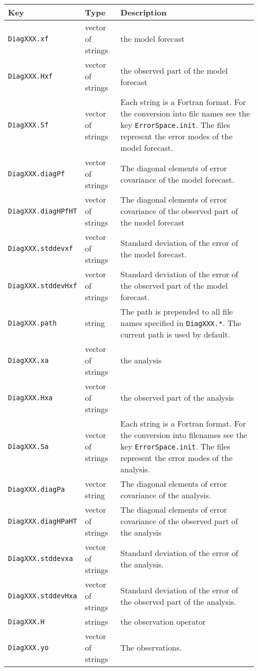 \documentclass[a4paper,12pt]{article}
\newcommand{\code}{\texttt}
\newenvironment{keytabular}{\begin{tabular}{|p{0.3\textwidth}|p{0.2\textwidth}|p{0.5\textwidth}|} \hline Key & Type & Description \\ \hline \hline }{\end{tabular}}
\begin{document}
\begin{keytabular}
\code{DiagXXX.xf} & vector of strings & the model forecast
\\
\code{DiagXXX.Hxf} & vector of strings & the observed part of the model forecast
\\
\code{DiagXXX.Sf} & vector of strings & Each string is a Fortran
format. For the conversion into file names see the key
\code{ErrorSpace.init}. The files represent
the error modes of the model forecast.
\\
\code{DiagXXX.diagPf} & vector of strings & The diagonal elements of error
covariance of the model forecast.
\\
\code{DiagXXX.diagHPfHT} & vector of strings & The diagonal elements of error
covariance of the observed part of the model forecast 
\\
\code{DiagXXX.stddevxf} & vector of strings & Standard deviation of
the error of the model forecast.
\\
\code{DiagXXX.stddevHxf} & vector of strings & Standard deviation of
the error of the observed part of the model forecast.
\\
\code{DiagXXX.path} & string & The path is prepended to all file names
specified in \code{DiagXXX.*}. The current path is used by default.
\\
\hline
\code{DiagXXX.xa} & vector of strings & the analysis
\\
\code{DiagXXX.Hxa} & vector of strings & the observed part of the analysis
\\
\code{DiagXXX.Sa} & vector of strings & Each string is a Fortran
format. For the conversion into filenames see the key
\code{ErrorSpace.init}. The files represent
the error modes of the analysis.
\\
\code{DiagXXX.diagPa} & vector string & The diagonal elements of error
covariance of the analysis.
\\
\code{DiagXXX.diagHPaHT} & vector of strings & The diagonal elements of error
covariance of the observed part of the analysis 
\\
\code{DiagXXX.stddevxa} & vector of strings & Standard deviation of
the error of the analysis.
\\
\code{DiagXXX.stddevHxa} & vector of strings & Standard deviation of
the error of the observed part of the analysis.
\\
\hline
\code{DiagXXX.H} & strings & the observation operator
\\
\code{DiagXXX.yo} & vector of strings & The observations.
\\

\end{keytabular}
\end{document}
